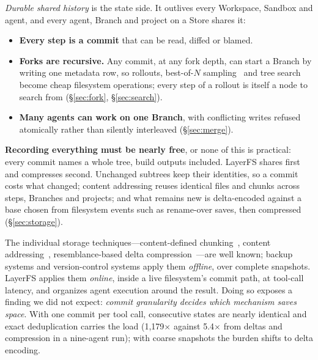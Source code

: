 \documentclass[letterpaper,twocolumn,10pt]{article}
\newcommand{\sys}{LayerFS}
\newcommand{\ws}{Workspace}
\newcommand{\X}{$\times$}
\begin{document}
\emph{Durable shared history} is the state side. It outlives every \ws{},
Sandbox and agent, and every agent, Branch and project on a Store shares it:
\begin{itemize}
\item \textbf{Every step is a commit} that can be read, diffed or blamed.
\item \textbf{Forks are recursive.} Any commit, at any fork depth, can start
  a Branch by writing one metadata row, so rollouts, best-of-$N$ sampling~\cite{monkeys} and tree
  search~\cite{tot,uct} become cheap filesystem operations; every step of a
  rollout is itself a node to search from (\S\ref{sec:fork},
  \S\ref{sec:search}).
\item \textbf{Many agents can work on one Branch}, with conflicting writes
  refused atomically rather than silently interleaved (\S\ref{sec:merge}).
\end{itemize}

\textbf{Recording everything must be nearly free}, or none of this is
practical: every commit names a whole tree, build outputs included. \sys{}
shares first and compresses second. Unchanged subtrees keep their
identities, so a commit costs what changed; content addressing reuses
identical files and chunks across steps, Branches and projects; and what
remains new is delta-encoded against a base chosen from filesystem events
such as rename-over saves, then compressed (\S\ref{sec:storage}).

The individual storage techniques---content-defined chunking~\cite{lbfs,fastcdc},
content addressing~\cite{venti,git}, resemblance-based delta
compression~\cite{shilane,finesse}---are well known; backup systems and
version-control systems apply them \emph{offline}, over complete snapshots.
\sys{} applies them \emph{online}, inside a live filesystem's commit path,
at tool-call latency, and organizes agent execution around the result. Doing
so exposes a finding we did not expect: \emph{commit granularity decides
which mechanism saves space}. With one commit per tool call, consecutive
states are nearly identical and exact deduplication carries the load
(1,179\X{} against 5.4\X{} from deltas and compression in a nine-agent run);
with coarse snapshots the burden shifts to delta encoding.
\end{document}
